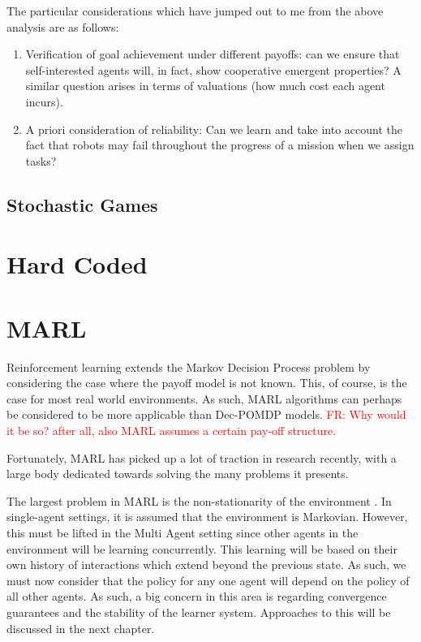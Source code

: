 \documentclass[preprint,11pt]{report}
\newcommand\fr[1]{\textcolor{red}{FR: #1}}
\begin{document}
The particular considerations which have jumped out to me from the above analysis are as follows:

\begin{enumerate} 
	\item Verification of goal achievement under different payoffs: can we ensure that
	self-interested agents will, in fact, show cooperative emergent properties? A similar question
	arises in terms of valuations (how much cost each agent incurs). 
	\item A priori consideration of
	reliability: Can we learn and take into account the fact that robots may fail throughout the
	progress of a mission when we assign tasks? 
\end{enumerate}

\subsection*{Stochastic Games}

\section{Hard Coded}

\section{MARL}

Reinforcement learning extends the Markov Decision Process problem by
considering the case where the payoff model is not known. This, of
course, is the case for most real world environments. As such, MARL
algorithms can perhaps be considered to be more applicable than
Dec-POMDP models.
\fr{Why would it be so? after all, also MARL assumes a certain pay-off structure.}

Fortunately, MARL has picked up a lot of traction in
research recently, with a large body dedicated towards solving the
many problems it presents.

The largest problem in MARL is the non-stationarity of the environment \cite{Hernandez-LealA}. In
single-agent settings, it is assumed that the environment is Markovian. However, this must be lifted
in the Multi Agent setting since other agents in the environment will be learning concurrently. This
learning will be based on their own history of interactions which extend beyond the previous state.
As such, we must now consider that the policy for any one agent will depend on the policy of all
other agents. As such, a big concern in this area is regarding convergence guarantees and the
stability of the learner system. Approaches to this will be discussed in the next chapter. 
\end{document}
